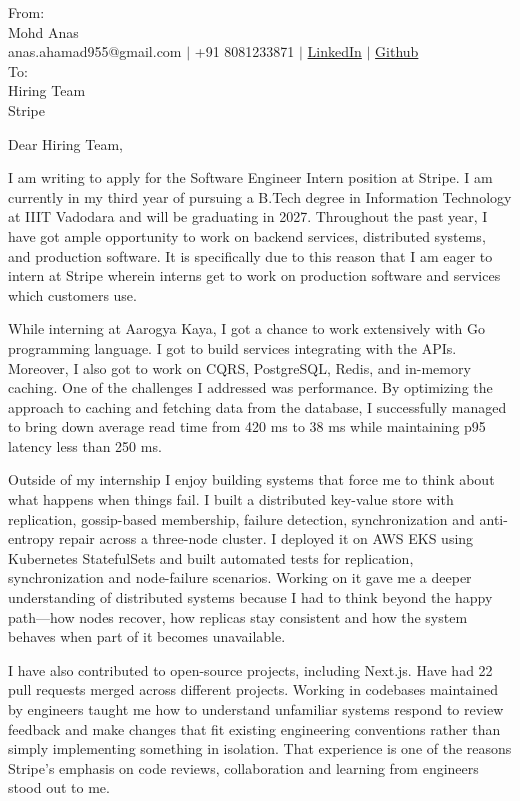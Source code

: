 \documentclass[10.5pt]{letter}
\begin{document}
\begin{letter}{
  From: \\
  Mohd  Anas \\
  anas.ahamad955@gmail.com $|$ +91 8081233871 $|$ \href{https://linkedin.com/in/anas-um}{LinkedIn} $|$ \href{https://github.com/Anas-github-acc}{Github} \\
  To: \\
  Hiring Team \\
  Stripe
}

\opening{Dear Hiring Team, }
I am writing to apply for the Software Engineer Intern position at Stripe. I am currently in my third year of pursuing a B.Tech degree in Information Technology at IIIT Vadodara and will be graduating in 2027. Throughout the past year, I have got ample opportunity to work on backend services, distributed systems, and production software. It is specifically due to this reason that I am eager to intern at Stripe wherein interns get to work on production software and services which customers use.

While interning at Aarogya Kaya, I got a chance to work extensively with Go programming language. I got to build services integrating with the APIs. Moreover, I also got to work on CQRS, PostgreSQL, Redis, and in-memory caching. One of the challenges I addressed was performance. By optimizing the approach to caching and fetching data from the database, I successfully managed to bring down average read time from 420 ms to 38 ms while maintaining p95 latency less than 250 ms.

Outside of my internship I enjoy building systems that force me to think about what happens when things fail. I built a distributed key-value store with replication, gossip-based membership, failure detection, synchronization and anti-entropy repair across a three-node cluster. I deployed it on AWS EKS using Kubernetes StatefulSets and built automated tests for replication, synchronization and node-failure scenarios. Working on it gave me a deeper understanding of distributed systems because I had to think beyond the happy path—how nodes recover, how replicas stay consistent and how the system behaves when part of it becomes unavailable.

I have also contributed to open-source projects, including Next.js. Have had 22 pull requests merged across different projects. Working in codebases maintained by engineers taught me how to understand unfamiliar systems respond to review feedback and make changes that fit existing engineering conventions rather than simply implementing something in isolation. That experience is one of the reasons Stripe’s emphasis on code reviews, collaboration and learning from engineers stood out to me.


\end{letter}
\end{document}
